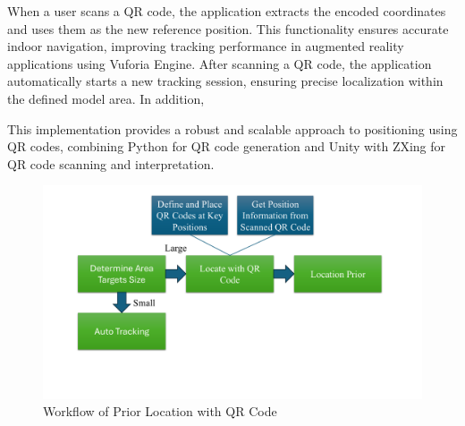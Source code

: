 When a user scans a QR code, the application extracts the encoded coordinates and uses them as the new reference position. This functionality ensures accurate indoor navigation, improving tracking performance in augmented reality applications using Vuforia Engine. After scanning a QR code, the application automatically starts a new tracking session, ensuring precise localization within the defined model area. In addition, 

This implementation provides a robust and scalable approach to positioning using QR codes, combining Python for QR code generation and Unity with ZXing for QR code scanning and interpretation.

\begin{figure}[ht]
  \centering
  \includegraphics[scale=0.5]{content/resources/images/chap-problems-solutions/location-0.PNG}
  \caption{Workflow of Prior Location with QR Code}
  \label{fig:location-0}
\end{figure}
